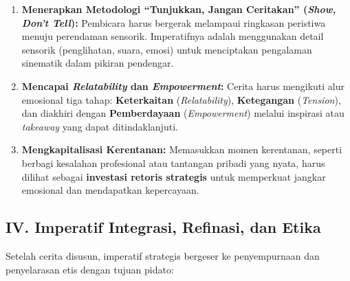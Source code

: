 \documentclass[
  letterpaper,
  DIV=11,
  numbers=noendperiod]{scrreprt}
\providecommand{\tightlist}{%
  \setlength{\itemsep}{0pt}\setlength{\parskip}{0pt}}
\begin{document}
\begin{enumerate}
\def\labelenumi{\arabic{enumi}.}
\tightlist
\item
  \textbf{Menerapkan Metodologi ``Tunjukkan, Jangan Ceritakan''
  (\emph{Show, Don't Tell}):} Pembicara harus bergerak melampaui
  ringkasan peristiwa menuju perendaman sensorik. Imperatifnya adalah
  menggunakan detail sensorik (penglihatan, suara, emosi) untuk
  menciptakan pengalaman sinematik dalam pikiran pendengar.
\item
  \textbf{Mencapai \emph{Relatability} dan \emph{Empowerment}:} Cerita
  harus mengikuti alur emosional tiga tahap: \textbf{Keterkaitan}
  (\emph{Relatability}), \textbf{Ketegangan} (\emph{Tension}), dan
  diakhiri dengan \textbf{Pemberdayaan} (\emph{Empowerment}) melalui
  inspirasi atau \emph{takeaway} yang dapat ditindaklanjuti.
\item
  \textbf{Mengkapitalisasi Kerentanan:} Memasukkan momen kerentanan,
  seperti berbagi kesalahan profesional atau tantangan pribadi yang
  nyata, harus dilihat sebagai \textbf{investasi retoris strategis}
  untuk memperkuat jangkar emosional dan mendapatkan kepercayaan.
\end{enumerate}

\subsection{IV. Imperatif Integrasi, Refinasi, dan
Etika}\label{iv.-imperatif-integrasi-refinasi-dan-etika}

Setelah cerita disusun, imperatif strategis bergeser ke penyempurnaan
dan penyelarasan etis dengan tujuan pidato:
\end{document}
